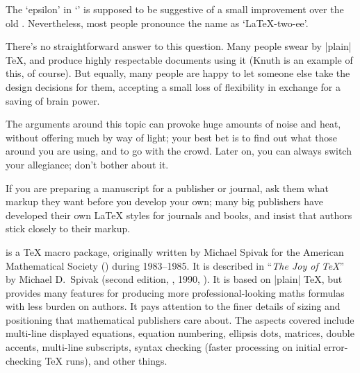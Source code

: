 The `epsilon' in `\LaTeXe{}' is supposed to be suggestive of a small
improvement over the old \LaTeXo{}.  Nevertheless, most people
pronounce the name as `\LaTeX{}-two-ee'.

\htmlignore
\par
\endhtmlignore
{}

There's no straightforward answer to this question.  Many people swear
by |plain| \TeX{}, and produce highly respectable documents using it
(Knuth is an example of this, of course).  But equally, many people
are happy to let someone else take the design decisions for them,
accepting a small loss of flexibility in exchange for a saving of
brain power.

The arguments around this topic can provoke huge amounts of noise and
heat, without offering much by way of light; your best bet is to find
out what those around you are using, and to go with the crowd.  Later
on, you can always switch your allegiance; don't bother about it.

If you are preparing a manuscript for a publisher or journal, ask them
what markup they want before you
develop your own; many big publishers have developed their own
\LaTeX{} styles for journals and books, and insist that authors stick
closely to their markup.

\htmlignore
\begingroup\boldmath
\endhtmlignore
{}
\htmlignore
\endgroup\par
\endhtmlignore

\AMSTeX{} is a \TeX{} macro package, originally written by Michael Spivak for
the American Mathematical Society () during 1983--1985. It
is described in
``\emph{The Joy of \TeX{}}'' by Michael D.~Spivak (second edition,
, 1990, ).  It is based on |plain| \TeX{}, but
provides many
features for producing more professional-looking maths formulas with
less burden on authors.  It pays attention to the finer details of
sizing and positioning that mathematical publishers care about. The
aspects covered include multi-line displayed equations, equation
numbering, ellipsis dots, matrices, double accents, multi-line
subscripts, syntax checking (faster processing on initial
error-checking \TeX{} runs), and other things.

